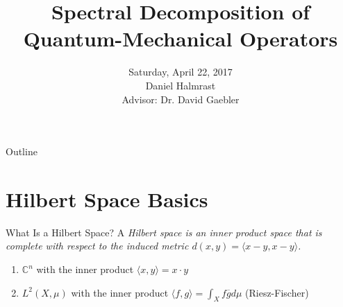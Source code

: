 \documentclass{beamer}
\title %
{Spectral Decomposition of Quantum-Mechanical Operators}
\institute[Hillsdale College] %
\date %
{Saturday, April 22, 2017\\Daniel Halmrast\\Advisor: Dr. David Gaebler}
\begin{document}
\begin{frame}
  \titlepage

\end{frame}

\begin{frame}{Outline}
  \tableofcontents
\end{frame}




\section{Hilbert Space Basics}
\begin{frame}{What Is a Hilbert Space?}
    A \em Hilbert space \em is an inner product space that is complete with
    respect to the induced metric $d(x,y) = \langle x-y, x-y \rangle$.
    \begin{example}
        \begin{enumerate}
        \item $\mathbb{C}^n$ with the inner product 
            $\langle x,y \rangle = x \cdot y$
        \item $L^2(X,\mu)$ with the inner product
            $\langle f,g \rangle = \int_X f\overline{g}d\mu$ (Riesz-Fischer)
        \end{enumerate}
    \end{example}
\end{frame}
\end{document}
